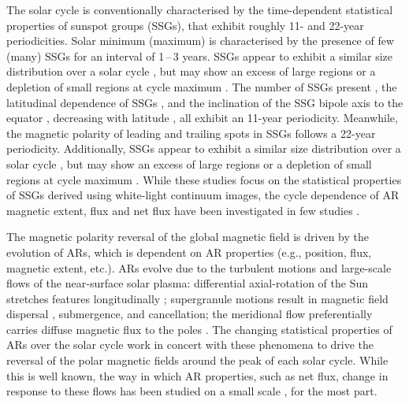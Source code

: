 \documentclass[namedreferences]{solarphysics}
\begin{document}
\begin{article}

The solar cycle is conventionally characterised by the time-dependent statistical properties of sunspot groups (SSGs), that exhibit roughly 11- and 22-year periodicities. Solar minimum (maximum) is characterised by the presence of few (many) SSGs for an interval of 1\,--\,3 years. 
SSGs appear to exhibit a similar size distribution over a solar cycle \citep{harvey:1993}, but may show an excess of large regions or a depletion of small regions at cycle maximum \citep{tang:1984,Hathaway:2010b,Lefevre:2011,Kilcik:2011,deToma:2013}.
The number of SSGs present \citep[sunspot number:][]{Schwabe:1844,Wolf:1861}, the latitudinal dependence of SSGs \citep[Sp$\ddot{\mbox{o}}$rer's law:][]{Maunder:1904}, and the inclination of the SSG bipole axis to the equator \cite[Joy's Law:][]{Hale:1919}, decreasing with latitude \citep{Howard:1991}, all exhibit an 11-year periodicity. Meanwhile, the magnetic polarity of leading and trailing spots in SSGs \citep[Hale's law;][]{Hale:1919} follows a 22-year periodicity.
Additionally, SSGs appear to exhibit a similar size distribution over a solar cycle \citep{harvey:1993}, but may show an excess of large regions or a depletion of small regions at cycle maximum \citep{tang:1984,Hathaway:2010b,Lefevre:2011,Kilcik:2011,deToma:2013}.
While these studies focus on the statistical properties of SSGs derived using white-light continuum images, the cycle dependence of AR magnetic extent, flux and net flux have been investigated in few studies \citep[e.g.,][]{meunier:2003,zharkov:2006}.

The magnetic polarity reversal of the global magnetic field is driven by the evolution of ARs, which is dependent on AR properties (e.g., position, flux, magnetic extent, etc.).
ARs evolve due to the turbulent motions and large-scale flows of the near-surface solar plasma: differential axial-rotation of the Sun stretches features longitudinally \citep{Babcock:1961}; supergranule motions result in magnetic field dispersal \citep{Leighton:1964}, submergence, and cancellation; the meridional flow preferentially carries diffuse magnetic flux to the poles \citep{Mosher:1977}. The changing statistical properties of ARs over the solar cycle work in concert with these phenomena to drive the reversal of the polar magnetic fields around the peak of each solar cycle. While this is well known, the way in which AR properties, such as net flux, change in response to these flows has been studied on a small scale \citep{Petrie:2013b}, for the most part. 


\end{article}
\end{document}
